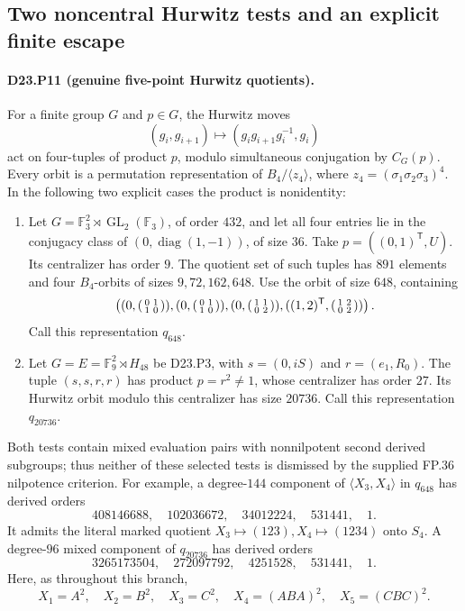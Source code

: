\subsection{Two noncentral Hurwitz tests and an explicit finite escape}

\paragraph{D23.P11 (genuine five-point Hurwitz quotients).}
For a finite group $G$ and $p\in G$, the Hurwitz moves
\[
 (g_i,g_{i+1})\longmapsto(g_ig_{i+1}g_i^{-1},g_i)
\tag{D23.P11.1}
\]
act on four-tuples of product $p$, modulo simultaneous conjugation
by $C_G(p)$. Every orbit is a permutation representation of
$B_4/\langle z_4\rangle$, where $z_4=(\sigma_1\sigma_2\sigma_3)^4$.
In the following two explicit cases the product is nonidentity:

\begin{enumerate}
\item Let $G=\mathbb F_3^2\rtimes\operatorname{GL}_2(\mathbb F_3)$,
of order $432$, and let all four entries lie in the conjugacy
class of $(0,\operatorname{diag}(1,-1))$, of size $36$.
Take $p=((0,1)^{\mathsf T},U)$. Its centralizer has order $9$.
The quotient set of such tuples has $891$ elements and four
$B_4$-orbits of sizes $9,72,162,648$. Use the orbit of size
$648$, containing
\[
 \left(
  (0,\begin{psmallmatrix}0&1\\1&0\end{psmallmatrix}),
  (0,\begin{psmallmatrix}0&1\\1&0\end{psmallmatrix}),
  (0,\begin{psmallmatrix}1&1\\0&2\end{psmallmatrix}),
  ((1,2)^{\mathsf T},\begin{psmallmatrix}1&2\\0&2\end{psmallmatrix})
 \right).
\]
Call this representation $q_{648}$.
\item Let $G=E=\mathbb F_9^2\rtimes H_{48}$ be D23.P3,
with $s=(0,iS)$ and $r=(e_1,R_0)$. The tuple $(s,s,r,r)$
has product $p=r^2\ne1$, whose centralizer has order $27$.
Its Hurwitz orbit modulo this centralizer has size $20736$.
Call this representation $q_{20736}$.
\end{enumerate}

Both tests contain mixed evaluation pairs with nonnilpotent
second derived subgroups; thus neither of these selected tests
is dismissed by the supplied FP.36 nilpotence criterion.
For example, a degree-$144$ component of
$\langle X_3,X_4\rangle$ in $q_{648}$ has derived orders
\[
408146688,\quad102036672,\quad34012224,\quad531441,\quad1.
\tag{D23.P11.2}
\]
It admits the literal marked quotient
$X_3\mapsto(123),X_4\mapsto(1234)$ onto $S_4$.
A degree-$96$ mixed component of $q_{20736}$ has derived orders
\[
3265173504,\quad272097792,\quad4251528,\quad531441,\quad1.
\tag{D23.P11.3}
\]
Here, as throughout this branch,
\[
 X_1=A^2,\quad X_2=B^2,\quad X_3=C^2,\quad
 X_4=(ABA)^2,\quad X_5=(CBC)^2.
\]

